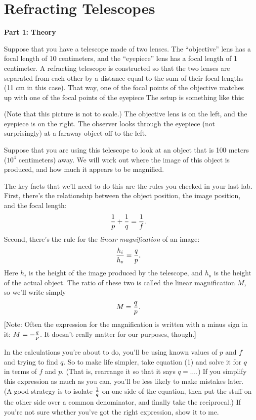 \chapter{Refracting Telescopes}


{\bf Part 1: Theory}

Suppose that you have a telescope made of two lenses.  The ``objective''
lens has a focal length of 10 centimeters, and the ``eyepiece'' lens
has a focal length of 1 centimeter.  A refracting telescope is constructed
so that the two lenses are separated from each other by a distance
equal to the sum of their focal lengths (11 cm in this case).  That
way, one of the focal points of the objective matches up with one
of the focal points of the eyepiece
The setup is something like this:

\medskip

\centerline{}

\medskip

(Note that this picture is not to scale.)  The objective lens is on the
left, and the eyepiece is on the right.  The observer looks through
the eyepiece (not surprisingly) at a faraway object off to the left.

Suppose that you are using this telescope to look at an object that is
100 meters ($10^4$ centimeters) away.  We will work out where the
image of this object is produced, and how much it appears to be magnified.

The key facts that we'll need to do this are the rules you checked
in your last lab.  First, there's the relationship between the object 
position, the image position, and the focal length:
\begin{equation}
{1\over p} + {1\over q} = {1\over f}.
\end{equation}
Second, there's the rule for the {\it linear magnification} of an image:
$$
{h_i\over h_o}={q\over p}.
$$
Here $h_i$ is the height of the image produced by the telescope,
and $h_o$ is the height of the actual object.  The ratio of these two
is called the linear magnification $M$, so we'll write simply
\begin{equation}
M={q\over p}.
\end{equation}
[Note: Often the expression for the magnification is written with a minus sign
in it: $M=-{q\over p}$.  It doesn't really matter for our purposes, though.]

In the calculations you're about to do, you'll be using known values of $p$ 
and $f$ and trying to find $q$.  So to make life simpler, take equation
(1) and solve it for $q$ in terms of $f$ and $p$.  (That is, rearrange
it so that it says $q=\ldots$.)  If you simplify this expression
as much as you can, you'll be less likely to make mistakes later.
(A good strategy is to isolate ${1\over q}$ on one side of the equation,
then put the stuff on the other side over a common denominator, and
finally take the reciprocal.)  If you're not sure whether you've
got the right expression, show it to me.

